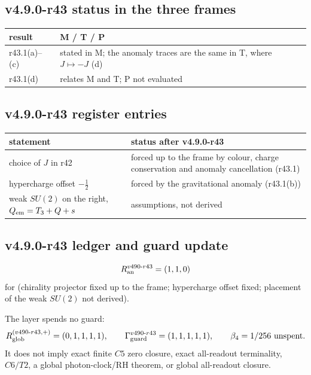 \subsection*{v4.9.0-r43 status in the three frames}
\label{subsec:v490-r43-frames}

\begin{center}
\small
\begin{tabular}{@{}>{\raggedright\arraybackslash}p{}>{\raggedright\arraybackslash}p{}@{}}
\toprule
result & M / T / P\\
\midrule
r43.1(a)--(c) & stated in M; the anomaly traces are the same in T, where \(J\mapsto-J\) (d)\\
r43.1(d) & relates M and T; P not evaluated\\
\bottomrule
\end{tabular}
\end{center}

\subsection*{v4.9.0-r43 register entries}
\label{subsec:v490-r43-register}

\begin{center}
\small
\begin{tabular}{@{}>{\raggedright\arraybackslash}p{}>{\raggedright\arraybackslash}p{}@{}}
\toprule
statement & status after v4.9.0-r43\\
\midrule
choice of \(J\) in r42 & forced up to the frame by colour, charge conservation and anomaly cancellation (r43.1)\\
hypercharge offset \(-\tfrac12\) & forced by the gravitational anomaly (r43.1(b))\\
weak \(SU(2)\) on the right, \(Q_{\rm em}=T_3+Q+s\) & assumptions, not derived\\
\bottomrule
\end{tabular}
\end{center}

\subsection*{v4.9.0-r43 ledger and guard update}
\label{subsec:v490-r43-ledger-guard}

\[
R_{\rm an}^{v490\text{-}r43}=(1,1,0)
\]
for (chirality projector fixed up to the frame; hypercharge offset fixed; placement of the weak \(SU(2)\) not derived).

The layer spends no guard:
\[
R_{\rm glob}^{(v490\text{-}r43,+)}=(0,1,1,1,1),
\qquad
\Gamma_{\rm guard}^{v490\text{-}r43}=(1,1,1,1,1),
\qquad
\beta_4=1/256\ \text{unspent}.
\]
It does not imply exact finite \(C5\) zero closure, exact all-readout terminality,
\(C6/T2\), a global photon-clock/RH theorem, or global all-readout closure.
